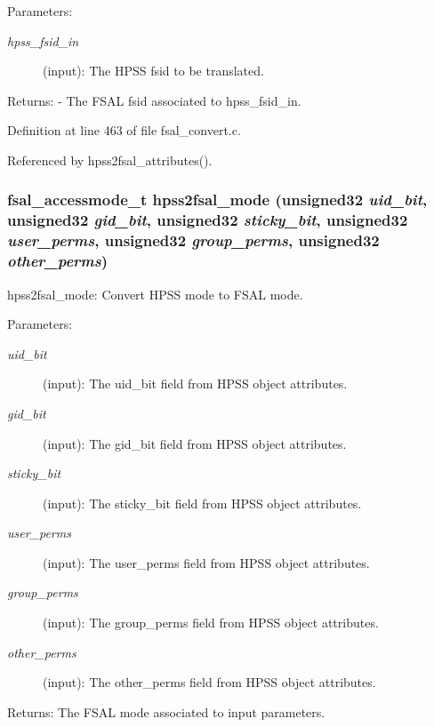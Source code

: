 \begin{Desc}
\item[Parameters:]
\begin{description}
\item[{\em hpss\_\-fsid\_\-in}](input): The HPSS fsid to be translated.\end{description}
\end{Desc}
\begin{Desc}
\item[Returns:]- The FSAL fsid associated to hpss\_\-fsid\_\-in. \end{Desc}


Definition at line 463 of file fsal\_\-convert.c.

Referenced by hpss2fsal\_\-attributes().
\subsubsection{\setlength{\rightskip}{0pt plus 5cm}fsal\_\-accessmode\_\-t hpss2fsal\_\-mode (unsigned32 {\em uid\_\-bit}, unsigned32 {\em gid\_\-bit}, unsigned32 {\em sticky\_\-bit}, unsigned32 {\em user\_\-perms}, unsigned32 {\em group\_\-perms}, unsigned32 {\em other\_\-perms})}\label{fsal__convert_8c_a12}


hpss2fsal\_\-mode: Convert HPSS mode to FSAL mode.

\begin{Desc}
\item[Parameters:]
\begin{description}
\item[{\em uid\_\-bit}](input): The uid\_\-bit field from HPSS object attributes. \item[{\em gid\_\-bit}](input): The gid\_\-bit field from HPSS object attributes. \item[{\em sticky\_\-bit}](input): The sticky\_\-bit field from HPSS object attributes. \item[{\em user\_\-perms}](input): The user\_\-perms field from HPSS object attributes. \item[{\em group\_\-perms}](input): The group\_\-perms field from HPSS object attributes. \item[{\em other\_\-perms}](input): The other\_\-perms field from HPSS object attributes.\end{description}
\end{Desc}
\begin{Desc}
\item[Returns:]The FSAL mode associated to input parameters. \end{Desc}


